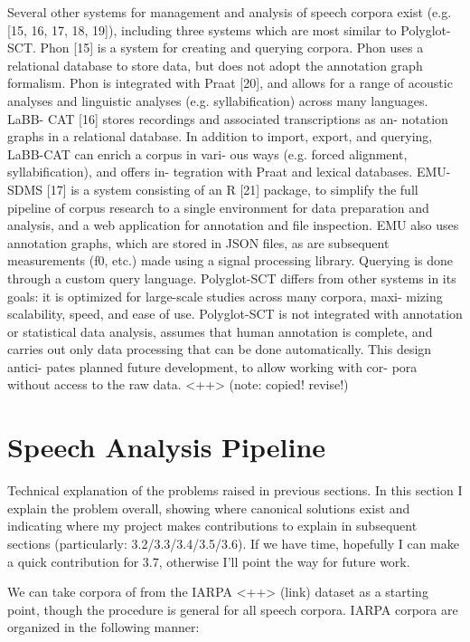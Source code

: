\documentclass[11pt]{article}
\begin{document}
Several other systems for management and analysis of speech
corpora exist (e.g. [15, 16, 17, 18, 19]), including three systems
which are most similar to Polyglot-SCT.
Phon [15] is a system for creating and querying corpora.
Phon uses a relational database to store data, but does not adopt
the annotation graph formalism. Phon is integrated with Praat
[20], and allows for a range of acoustic analyses and linguistic
analyses (e.g. syllabification) across many languages. LaBB-
CAT [16] stores recordings and associated transcriptions as an-
notation graphs in a relational database. In addition to import,
export, and querying, LaBB-CAT can enrich a corpus in vari-
ous ways (e.g. forced alignment, syllabification), and offers in-
tegration with Praat and lexical databases. EMU-SDMS [17]
is a system consisting of an R [21] package, to simplify the
full pipeline of corpus research to a single environment for data
preparation and analysis, and a web application for annotation
and file inspection. EMU also uses annotation graphs, which
are stored in JSON files, as are subsequent measurements (f0,
etc.) made using a signal processing library. Querying is done
through a custom query language.
Polyglot-SCT differs from other systems in its goals: it is
optimized for large-scale studies across many corpora, maxi-
mizing scalability, speed, and ease of use. Polyglot-SCT is not
integrated with annotation or statistical data analysis, assumes
that human annotation is complete, and carries out only data
processing that can be done automatically. This design antici-
pates planned future development, to allow working with cor-
pora without access to the raw data.
<++> (note: copied! revise!)

\section{Speech Analysis Pipeline}

Technical explanation of the problems raised in previous sections. In this section I explain the problem overall, showing where canonical solutions exist and indicating where my project makes contributions to explain in subsequent sections (particularly: 3.2/3.3/3.4/3.5/3.6). If we have time, hopefully I can make a quick contribution for 3.7, otherwise I'll point the way for future work.

We can take corpora of from the IARPA <++> (link) dataset as a starting point, though the procedure is general for all speech corpora. IARPA corpora are organized in the following manner:
\end{document}
